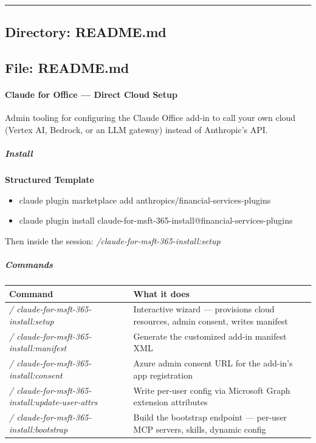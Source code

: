 \documentclass[11pt]{article}
\begin{document}
\vspace{0.8em}\hrule\vspace{0.8em}

\subsection{Directory: README.md}

\subsection{File: README.md}\label{file:README-md}

\paragraph{Claude for Office — Direct Cloud Setup}\mbox{}\par

Admin tooling for configuring the Claude Office add-in to call your own cloud (Vertex AI, Bedrock, or an LLM gateway) instead of Anthropic's API.


\subparagraph{Install}\mbox{}\par

\textbf{Structured Template}
\begin{itemize}[leftmargin=*,itemsep=2pt,topsep=2pt]
\item {} claude plugin marketplace add anthropics/financial-services-plugins
\item {} claude plugin install claude-for-msft-365-install@financial-services-plugins
\end{itemize}

Then inside the session: \emph{/claude-for-msft-365-install:setup}


\subparagraph{Commands}\mbox{}\par

\begingroup
\small
\setlength{\tabcolsep}{2pt}
\begin{longtable}{>{\RaggedRight\arraybackslash\hspace{0pt}}p{}>{\RaggedRight\arraybackslash\hspace{0pt}}p{}}
\toprule
{} \textbf{Command} & \textbf{What it does} \\
\midrule
{} \emph{/ claude-for-msft-365-install:setup} & Interactive wizard — provisions cloud resources, admin consent, writes manifest \\
{} \emph{/ claude-for-msft-365-install:manifest} & Generate the customized add-in manifest XML \\
{} \emph{/ claude-for-msft-365-install:consent} & Azure admin consent URL for the add-in's app registration \\
{} \emph{/ claude-for-msft-365-install:update-user-attrs} & Write per-user config via Microsoft Graph extension attributes \\
{} \emph{/ claude-for-msft-365-install:bootstrap} & Build the bootstrap endpoint — per-user MCP servers, skills, dynamic config \\
\bottomrule
\end{longtable}
\endgroup
\end{document}
